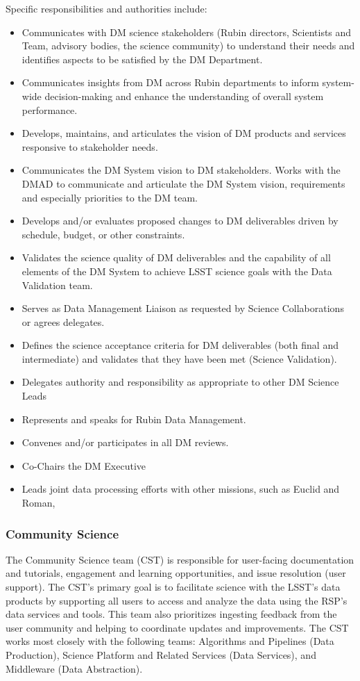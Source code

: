 Specific responsibilities and authorities include:
\begin{itemize}
\item Communicates with DM science stakeholders (Rubin directors, Scientists and Team, advisory bodies, the science community) to understand their needs and identifies aspects to be satisfied by the DM Department.
\item Communicates insights from DM across Rubin departments to inform system-wide decision-making and enhance the understanding of overall system performance.
\item Develops, maintains, and articulates the vision of DM products and services responsive to stakeholder needs.
\item Communicates the DM System vision to DM stakeholders. Works with the DMAD to communicate and articulate the DM System vision, requirements and especially priorities  to the DM  team.
\item Develops and/or evaluates proposed changes to DM deliverables driven by schedule, budget, or other constraints.
\item Validates the science quality of DM deliverables and the capability of all elements of the DM System to achieve LSST science goals with the Data Validation team.
\item Serves as Data Management Liaison as requested by Science Collaborations or agrees delegates.
\item Defines the science acceptance criteria for DM deliverables (both final and intermediate) and validates that they have been met (Science Validation).
\item Delegates authority and responsibility as appropriate to other DM Science Leads
\item Represents and speaks for Rubin  Data Management.
\item Convenes and/or participates in all DM reviews.
\item Co-Chairs the DM Executive
\item Leads joint data processing efforts with other missions, such as Euclid and Roman,
\end{itemize}

\subsubsection{Community Science}
The Community Science team (CST) is responsible for user-facing documentation and tutorials, engagement and learning opportunities, and issue resolution (user support).
The CST's primary goal is to facilitate science with the LSST's data products by supporting all users to access and analyze the data using the RSP's data services and tools.
This team also prioritizes ingesting feedback from the user community and helping to coordinate updates and improvements.
The CST works most closely with the following teams: Algorithms and Pipelines (Data Production), Science Platform and Related Services (Data Services), and Middleware (Data Abstraction).

